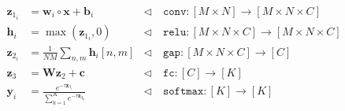 

\begin{align}
    \mathbf{z}_{1_i} &= \mathbf{w}_i \circ \mathbf{x} + \mathbf{b}_i &\triangleleft \quad \texttt{conv}: [M \times N] \rightarrow [M \times N \times C]\\
    \mathbf{h}_i &= \max(\mathbf{z}_{1_i},0) &\triangleleft \quad \texttt{relu}: [M \times N \times C] \rightarrow [M \times N \times C]\\
    \mathbf{z}_{2_i} &= \frac{1}{NM} \sum_{n,m} \mathbf{h}_i[n,m]  &\triangleleft \quad \texttt{gap}: [M \times N \times C] \rightarrow [C]\\
    \mathbf{z}_{3} &= \mathbf{W} \mathbf{z}_{2} + \mathbf{c} &\triangleleft \quad \texttt{fc}: [C] \rightarrow [K]\\
    \mathbf{y}_i &= \frac{e^{-\tau \mathbf{z}_{3_i}}}{\sum_{k=1}^K e^{-\tau \mathbf{z}_{3_k}}} &\triangleleft \quad \texttt{softmax}: [K] \rightarrow [K]
\end{align}

